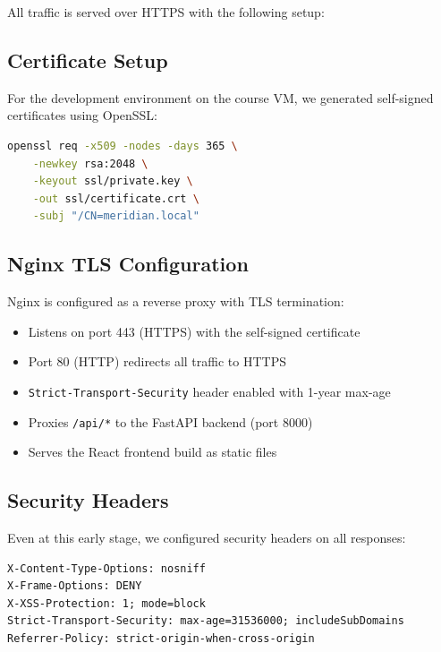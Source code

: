 \documentclass[12pt, a4paper]{article}
\begin{document}
All traffic is served over HTTPS with the following setup:

\subsection{Certificate Setup}

For the development environment on the course VM, we generated self-signed certificates using OpenSSL:

\begin{lstlisting}[language=bash]
openssl req -x509 -nodes -days 365 \
    -newkey rsa:2048 \
    -keyout ssl/private.key \
    -out ssl/certificate.crt \
    -subj "/CN=meridian.local"
\end{lstlisting}

\subsection{Nginx TLS Configuration}

Nginx is configured as a reverse proxy with TLS termination:

\begin{itemize}
    \item Listens on port 443 (HTTPS) with the self-signed certificate
    \item Port 80 (HTTP) redirects all traffic to HTTPS
    \item \texttt{Strict-Transport-Security} header enabled with 1-year max-age
    \item Proxies \texttt{/api/*} to the FastAPI backend (port 8000)
    \item Serves the React frontend build as static files
\end{itemize}

\subsection{Security Headers}

Even at this early stage, we configured security headers on all responses:

\begin{lstlisting}
X-Content-Type-Options: nosniff
X-Frame-Options: DENY
X-XSS-Protection: 1; mode=block
Strict-Transport-Security: max-age=31536000; includeSubDomains
Referrer-Policy: strict-origin-when-cross-origin
\end{lstlisting}

\end{document}
